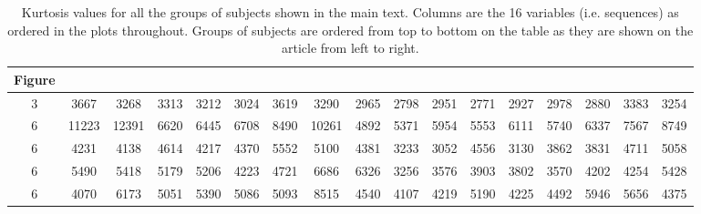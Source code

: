 \documentclass[12pt,letterpaper]{article}
\begin{document}
\clearpage

\begin{table}[t]
\centering
\begin{adjustbox}{width=1\textwidth}
\begin{tabular}{c|cccccccccccccccc}
Figure & \\
\hline
3 & 3667 & 3268 & 3313 & 3212 & 3024 & 3619 & 3290 & 2965 & 2798 & 2951 & 2771 & 2927 & 2978 & 2880 & 3383 & 3254 \\ \hline
6 & 11223 & 12391 & 6620 & 6445 & 6708 & 8490 & 10261 & 4892 & 5371 & 5954 & 5553 & 6111 & 5740 & 6337 & 7567 & 8749 \\ 
6 & 4231 & 4138 & 4614 & 4217 & 4370 & 5552 & 5100 & 4381 & 3233 & 3052 & 4556 & 3130 & 3862 & 3831 & 4711 & 5058 \\ 
6 & 5490 & 5418 & 5179 & 5206 & 4223 & 4721 & 6686 & 6326 & 3256 & 3576 & 3903 & 3802 & 3570 & 4202 & 4254 & 5428 \\ 
6 & 4070 & 6173 & 5051 & 5390 & 5086 & 5093 & 8515 & 4540 & 4107 & 4219 & 5190 & 4225 & 4492 & 5946 & 5656 & 4375 \\ 
\end{tabular}
\end{adjustbox}
\caption[]{Kurtosis values for all the groups of subjects shown in the main text. Columns are the 16 variables (i.e. sequences) as ordered in the plots throughout. Groups of subjects are ordered from top to bottom on the table as they are shown on the article from left to right.}
\end{table}

\clearpage
\end{document}
